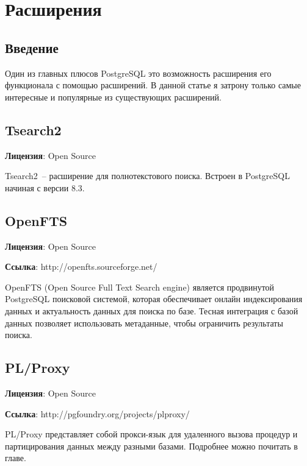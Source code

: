 \chapter{Расширения}
\begin{epigraphs}
\end{epigraphs}

\section{Введение}
Один из главных плюсов PostgreSQL это возможность расширения его функционала с помощью расширений. 
В данной статье я затрону только самые интересные и популярные из существующих расширений. 








\section{Tsearch2}
\textbf{Лицензия}: Open Source

Tsearch2~-- расширение для полнотекстового поиска. Встроен в PostgreSQL начиная с версии 8.3.

\section{OpenFTS}
\textbf{Лицензия}: Open Source

\textbf{Ссылка}: http://openfts.sourceforge.net/

OpenFTS (Open Source Full Text Search engine) является продвинутой PostgreSQL поисковой системой, которая обеспечивает 
онлайн индексирования данных и актуальность данных для поиска по базе. Тесная интеграция с базой данных позволяет использовать метаданные, 
чтобы ограничить результаты поиска.

\section{PL/Proxy}
\textbf{Лицензия}: Open Source

\textbf{Ссылка}: http://pgfoundry.org/projects/plproxy/

PL/Proxy представляет собой прокси-язык для удаленного вызова процедур и партицирования данных между разными базами. 
Подробнее можно почитать в  главе.

